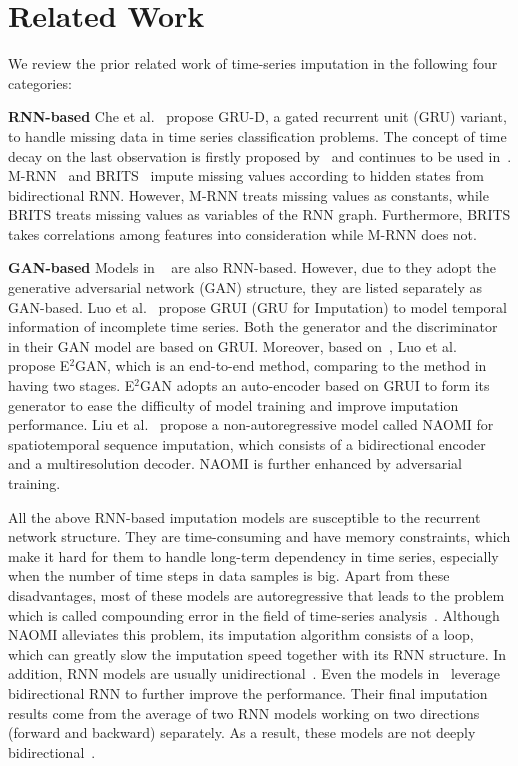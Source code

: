 \documentclass{article}
\begin{document}
\section{Related Work} \label{related_work}
We review the prior related work of time-series imputation in the following four categories:

\textbf{RNN-based} \hspace{1em} 
Che et al.~\cite{Che2018GRUD} propose GRU-D, a gated recurrent unit (GRU) variant, to handle missing data in time series classification problems. The concept of time decay on the last observation is firstly proposed by~\cite{Che2018GRUD} and continues to be used in~\cite{Cao2018BRITS, Yoon2019MRNN, Luo2018GRUI, Luo2019E2GAN}. M-RNN~\cite{Yoon2019MRNN} and BRITS~\cite{Cao2018BRITS} impute missing values according to hidden states from bidirectional RNN. However, M-RNN treats missing values as constants, while BRITS treats missing values as variables of the RNN graph. Furthermore, BRITS takes correlations among features into consideration while M-RNN does not.

\textbf{GAN-based} \hspace{1em}
Models in ~\cite{Luo2018GRUI,Luo2019E2GAN,Liu2019NAOMI} are also RNN-based. However, due to they adopt the generative adversarial network (GAN) structure, they are listed separately as GAN-based. Luo et al.~\cite{Luo2018GRUI} propose GRUI (GRU for Imputation) to model temporal information of incomplete time series. Both the generator and the discriminator in their GAN model are based on GRUI. Moreover, based on~\cite{Luo2018GRUI}, Luo et al.~\cite{Luo2019E2GAN} propose E$^2$GAN, which is an end-to-end method, comparing to the method in~\cite{Luo2018GRUI} having two stages. E$^2$GAN adopts an auto-encoder based on GRUI to form its generator to ease the difficulty of model training and improve imputation performance. Liu et al.~\cite{Liu2019NAOMI} propose a non-autoregressive model called NAOMI for spatiotemporal sequence imputation, which consists of a bidirectional encoder and a multiresolution decoder. NAOMI is further enhanced by adversarial training.

All the above RNN-based imputation models are susceptible to the recurrent network structure. They are time-consuming and have memory constraints, which make it hard for them to handle long-term dependency in time series, especially when the number of time steps in data samples is big. Apart from these disadvantages, most of these models are autoregressive that leads to the problem which is called compounding error in the field of time-series analysis~\cite{Venkatraman2015TimeSeries}. Although NAOMI alleviates this problem, its imputation algorithm consists of a loop, which can greatly slow the imputation speed together with its RNN structure. In addition, RNN models are usually unidirectional~\cite{Che2018GRUD,Luo2018GRUI,Luo2019E2GAN}. Even the models in~\cite{Cao2018BRITS,Yoon2019MRNN,Liu2019NAOMI} leverage bidirectional RNN to further improve the performance. Their final imputation results come from the average of two RNN models working on two directions (forward and backward) separately. As a result, these models are not deeply bidirectional~\cite{Devlin2019BERT}.
\end{document}
